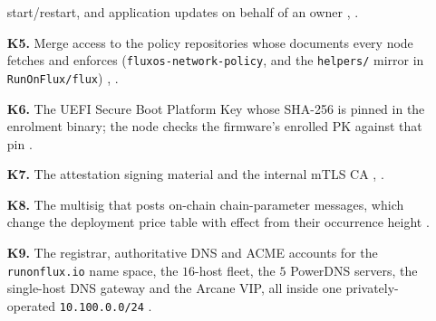 \begin{definition}
\begin{itemize}
        start/restart, and application updates on behalf of an owner
        ,
        .
  \item[\textbf{K5.}] Merge access to the policy repositories whose documents every node fetches and enforces
        (\texttt{fluxos-\allowbreak{}network-\allowbreak{}policy}, and the \texttt{helpers/} mirror in \texttt{RunOnFlux/flux})
        ,
        .
  \item[\textbf{K6.}] The UEFI Secure Boot Platform Key whose SHA-256 is pinned in the \ArcaneOS{} enrolment
        binary; the node checks the firmware's enrolled PK against that pin
        .
  \item[\textbf{K7.}] The \fluxsas{} attestation signing material and the internal mTLS CA
        , .
  \item[\textbf{K8.}] The multisig that posts on-chain chain-parameter messages, which change the deployment price
        table with effect from their occurrence height
        .
  \item[\textbf{K9.}] The registrar, authoritative DNS and ACME accounts for the \texttt{runonflux.io}
        name space, the $16$-host \FDM{} fleet, the $5$ PowerDNS servers, the single-host DNS gateway
        and the Arcane VIP, all inside one privately-operated \texttt{10.100.0.0/24}
        .
\end{itemize}


\end{definition}
